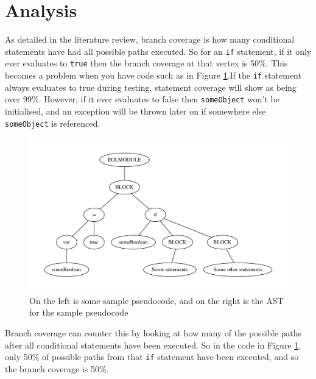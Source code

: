 \section{Analysis}

As detailed in the literature review, branch coverage is how many conditional statements have had all possible paths executed. So for an \verb|if| statement, if it only ever evaluates to \verb|true| then the branch coverage at that vertex is 50\%. This becomes a problem when you have code such as in Figure \ref{lst:branchingExample}.If the \verb|if| statement always evaluates to true during testing, statement coverage will show as being over 99\%. However, if it ever evaluates to false then \verb|someObject| won't be initialised, and an exception will be thrown later on if somewhere else \verb|someObject| is referenced.

\begin{figure}
\centering
\begin{minipage}{.4\textwidth}
  \centering
  
\end{minipage}%
\begin{minipage}{.5\textwidth}
  \centering
  \includegraphics[scale=0.4]{figures/branchSampleAST.pdf}
\end{minipage}
\caption{On the left is some sample pseudocode, and on the right is the AST for the sample pseudocode}
  \label{lst:branchingExample}
\end{figure}

Branch coverage can counter this by looking at how many of the possible paths after all conditional statements have been executed. So in the code in Figure \ref{lst:branchingExample}, only 50\% of possible paths from that \verb|if| statement have been executed, and so the branch coverage is 50\%.

